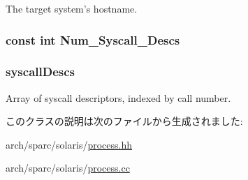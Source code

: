 The target system's hostname. \hypertarget{classSparcISA_1_1SparcSolarisProcess_a9534988905c6f5c8c57c4b6a7b179fea}{
\subsubsection[{Num\_\-Syscall\_\-Descs}]{\setlength{\rightskip}{0pt plus 5cm}const int {\bf Num\_\-Syscall\_\-Descs}}}
\label{classSparcISA_1_1SparcSolarisProcess_a9534988905c6f5c8c57c4b6a7b179fea}
\hypertarget{classSparcISA_1_1SparcSolarisProcess_a08d67a94820b75842e07f030e548372e}{
\subsubsection[{syscallDescs}]{ {\bf syscallDescs}}}
\label{classSparcISA_1_1SparcSolarisProcess_a08d67a94820b75842e07f030e548372e}


Array of syscall descriptors, indexed by call number. 

このクラスの説明は次のファイルから生成されました:\begin{DoxyCompactItemize}
\item 
arch/sparc/solaris/\hyperlink{arch_2sparc_2solaris_2process_8hh}{process.hh}\item 
arch/sparc/solaris/\hyperlink{arch_2sparc_2solaris_2process_8cc}{process.cc}\end{DoxyCompactItemize}
